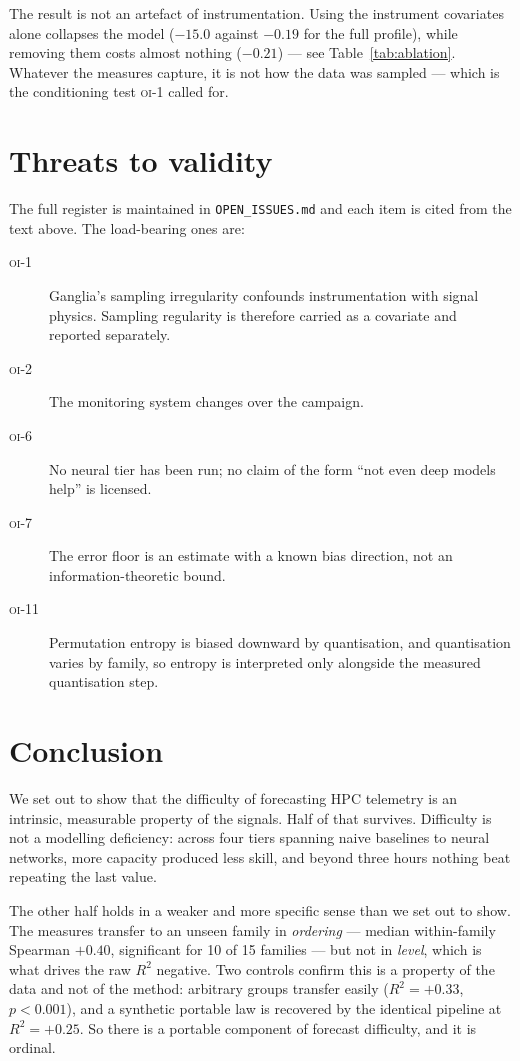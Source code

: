 \documentclass[11pt,a4paper]{article}
\newcommand{\num}[1]{#1}
\newcommand{\oi}[1]{\textsc{oi-#1}}
\begin{document}
The result is not an artefact of instrumentation. Using the instrument covariates
alone collapses the model (\(-15.0\) against \(-0.19\) for the full profile),
while removing them costs almost nothing (\(-0.21\)) --- see
Table~\ref{tab:ablation}. Whatever the
measures capture, it is not how the data was sampled --- which is the
conditioning test \oi{1} called for.

\section{Threats to validity}
\label{sec:threats}

The full register is maintained in \texttt{OPEN\_ISSUES.md} and each item is
cited from the text above. The load-bearing ones are:

\begin{description}
  \item[\oi{1}] Ganglia's sampling irregularity confounds instrumentation with
        signal physics. Sampling regularity is therefore carried as a covariate
        and reported separately.
  \item[\oi{2}] The monitoring system changes over the campaign.
  \item[\oi{6}] No neural tier has been run; no claim of the form ``not even
        deep models help'' is licensed.
  \item[\oi{7}] The error floor is an estimate with a known bias direction, not
        an information-theoretic bound.
  \item[\oi{11}] Permutation entropy is biased downward by quantisation, and
        quantisation varies by family, so entropy is interpreted only alongside
        the measured quantisation step.
\end{description}

\section{Conclusion}

We set out to show that the difficulty of forecasting HPC telemetry is an
intrinsic, measurable property of the signals. Half of that survives. Difficulty
is not a modelling deficiency: across four tiers spanning naive baselines to
neural networks, more capacity produced less skill, and beyond three hours
nothing beat repeating the last value.

The other half holds in a weaker and more specific sense than we set out to
show. The measures transfer to an unseen family in \emph{ordering} --- median
within-family Spearman \(+0.40\), significant for \num{10} of \num{15}
families --- but not in \emph{level}, which is what drives the raw \(R^2\)
negative. Two controls confirm this is a property of the data and not of the method:
arbitrary groups transfer easily (\(R^2 = +0.33\), \(p<0.001\)), and a
synthetic portable law is recovered by the identical pipeline at
\(R^2 = +0.25\). So there is a portable component of forecast difficulty, and
it is ordinal.
\end{document}

